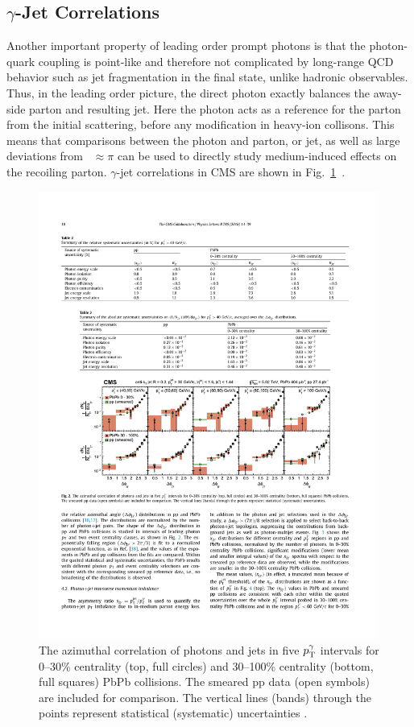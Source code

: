 \subsection{$\gamma$-Jet Correlations}
\label{sec:intro_gj}
Another important property of leading order prompt photons is that the photon-quark coupling is point-like and therefore not complicated by long-range QCD behavior such as jet fragmentation in the final state, unlike hadronic observables. Thus, in the leading order picture, the direct photon exactly balances the away-side parton and resulting jet. Here the photon acts as a reference for the parton from the initial scattering, before any modification in heavy-ion collisons. This means that comparisons between the photon and parton, or jet, as well as large deviations from \deltaphi~$\approx\pi$ can be used to directly study medium-induced effects on the recoiling parton. $\gamma$-jet correlations in CMS are shown in Fig.~\ref{fig:cms_gj_correlations}~\cite{Sirunyan2018}.


\begin{figure}[htpb]
  \centering
  \includegraphics[width=0.99\textwidth]{Introduction/cms_gj_correlations.pdf}
  \caption{The azimuthal correlation of photons and jets in five $p_{\mathrm{T}}^\gamma$ intervals for 0–30\% centrality (top, full circles) and 30–100\% centrality (bottom, full squares) PbPb collisions. The smeared pp data (open symbols) are included for comparison. The vertical lines (bands) through the points represent statistical (systematic) uncertainties \cite{Sirunyan2018}.}
  \label{fig:cms_gj_correlations}
\end{figure}


